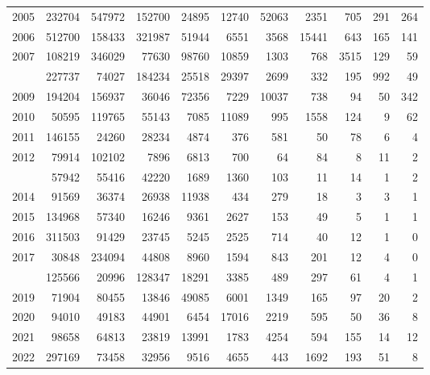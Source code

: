 \documentclass[
]{article}
\begin{document}
\begin{longtable}[t]{lrrrrrrrrrr}
2005 & 232704 & 547972 & 152700 & 24895 & 12740 & 52063 & 2351 & 705 & 291 & 264\\
2006 & 512700 & 158433 & 321987 & 51944 & 6551 & 3568 & 15441 & 643 & 165 & 141\\
2007 & 108219 & 346029 & 77630 & 98760 & 10859 & 1303 & 768 & 3515 & 129 & 59\\
\addlinespace
2008 & 227737 & 74027 & 184234 & 25518 & 29397 & 2699 & 332 & 195 & 992 & 49\\
2009 & 194204 & 156937 & 36046 & 72356 & 7229 & 10037 & 738 & 94 & 50 & 342\\
2010 & 50595 & 119765 & 55143 & 7085 & 11089 & 995 & 1558 & 124 & 9 & 62\\
2011 & 146155 & 24260 & 28234 & 4874 & 376 & 581 & 50 & 78 & 6 & 4\\
2012 & 79914 & 102102 & 7896 & 6813 & 700 & 64 & 84 & 8 & 11 & 2\\
\addlinespace
2013 & 57942 & 55416 & 42220 & 1689 & 1360 & 103 & 11 & 14 & 1 & 2\\
2014 & 91569 & 36374 & 26938 & 11938 & 434 & 279 & 18 & 3 & 3 & 1\\
2015 & 134968 & 57340 & 16246 & 9361 & 2627 & 153 & 49 & 5 & 1 & 1\\
2016 & 311503 & 91429 & 23745 & 5245 & 2525 & 714 & 40 & 12 & 1 & 0\\
2017 & 30848 & 234094 & 44808 & 8960 & 1594 & 843 & 201 & 12 & 4 & 0\\
\addlinespace
2018 & 125566 & 20996 & 128347 & 18291 & 3385 & 489 & 297 & 61 & 4 & 1\\
2019 & 71904 & 80455 & 13846 & 49085 & 6001 & 1349 & 165 & 97 & 20 & 2\\
2020 & 94010 & 49183 & 44901 & 6454 & 17016 & 2219 & 595 & 50 & 36 & 8\\
2021 & 98658 & 64813 & 23819 & 13991 & 1783 & 4254 & 594 & 155 & 14 & 12\\
2022 & 297169 & 73458 & 32956 & 9516 & 4655 & 443 & 1692 & 193 & 51 & 8\\*
\end{longtable}
\end{document}
